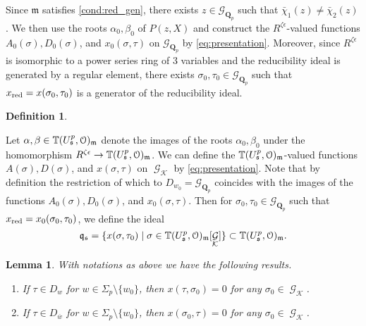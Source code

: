 \documentclass[leqno]{amsart}
\newtheorem{lem}[thm]{Lemma}
\theoremstyle{definition}
\newtheorem{defn}[thm]{Definition}
\theoremstyle{remark}
\newcommand{\eo}{\EuScript{O}}
\newcommand{\Qp}{\mathbf{Q}_p}
\DeclareMathOperator{\Gal}{\mathcal{G}}
\newcommand{\fm}{\mathfrak{m}}
\newcommand{\fq}{\mathfrak{q}}
\newcommand{\fs}{\mathfrak{s}}
\newcommand{\Gp}{\mathcal{G}_{\Qp}} %
\newcommand{\xx}{x_\textnormal{red}}
\newcommand{\K}{{\mathcal{K}}} %
\newcommand{\bw}{\overline{w}}
\newcommand{\TT}{\mathbb{T}} %
\begin{document}
Since $\fm$ satisfies \eqref{cond:red_gen},
there exists $z\in\Gp$ such that 
$\bar{\chi}_1(z)\neq\bar{\chi}_2(z)$.
We then use the roots $\alpha_0,\beta_0$ of $P(z,X)$
and construct the $R^{\zeta\epsilon}$-valued functions
$A_0(\sigma),D_0(\sigma)$, and $x_0(\sigma,\tau)$ 
on $\Gp$ by \eqref{eq:presentation}.
Moreover, since $R^{\zeta\epsilon}$
is isomorphic to a power series ring of 3 variables
and the reducibility ideal is generated by a regular element,
there exists $\sigma_0,\tau_0\in\Gp$ such that
$\xx=x(\sigma_0,\tau_0)$ is a 
generator of the reducibility ideal.

\begin{defn}\label{def:fq_ideal}

Let $\alpha,\beta\in \TT(U^p_\fs,\eo)_\fm$
denote the images of the roots $\alpha_0,\beta_0$
under the homomorphism $R^{\zeta\epsilon}\to \TT(U^p_\fs,\eo)_\fm$.
We can define the $\TT(U^p_\fs,\eo)_\fm$-valued functions
$A(\sigma), D(\sigma)$, and $x(\sigma,\tau)$ on $\Gal_\K$
by \eqref{eq:presentation}.
Note that by definition the restriction of which to 
$D_{w_0}=\Gp$ coincides with the images of the functions
$A_0(\sigma), D_0(\sigma)$, and $x_0(\sigma,\tau)$.
Then for $\sigma_0,\tau_0\in\Gp$ such that 
$\xx=x_0(\sigma_0,\tau_0)$, we define the ideal
\[
    \fq_\fs=\{x(\sigma,\tau_0)\mid\sigma\in\TT(U^p_\fs,\eo)_\fm[\Gal_\K]\}
    \subset \TT(U^p_\fs,\eo)_\fm.
\]
\end{defn}

\begin{lem}
With notations as above we have the following results.
\begin{enumerate}
    \item If $\tau\in D_w$ for $w\in\Sigma_p\setminus\{w_0\}$,
    then $x(\tau,\sigma_0)=0$ for any $\sigma_0\in \Gal_\K$.
    \item If $\tau\in D_{\bw}$ for $w\in\Sigma_p\setminus\{w_0\}$,
    then $x(\sigma_0,\tau)=0$ for any $\sigma_0\in \Gal_\K$.
\end{enumerate}
\end{lem}
\end{document}
